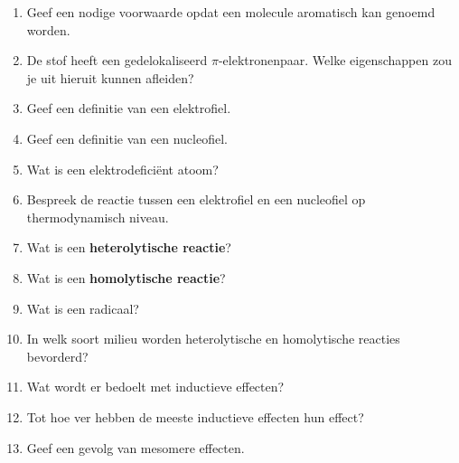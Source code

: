 \documentclass[a4paper,12pt]{article}
\begin{document}
\begin{enumerate}
        \item Geef een nodige voorwaarde opdat een molecule aromatisch kan genoemd worden.
        \item De stof  heeft een gedelokaliseerd $\pi$-elektronenpaar. Welke eigenschappen zou je uit hieruit kunnen afleiden? 
        \item Geef een definitie van een elektrofiel.
        \item Geef een definitie van een nucleofiel.
        \item Wat is een elektrodefici\"ent atoom?
        \item Bespreek de reactie tussen een elektrofiel en een nucleofiel op thermodynamisch niveau.
        \item Wat is een \textbf{heterolytische reactie}?
        \item Wat is een \textbf{homolytische reactie}?
        \item Wat is een radicaal?
        \item In welk soort milieu worden heterolytische en homolytische reacties bevorderd?
        \item Wat wordt er bedoelt met inductieve effecten?
        \item Tot hoe ver hebben de meeste inductieve effecten hun effect?
        \item Geef een gevolg van mesomere effecten.
    \end{enumerate}
\end{document}
